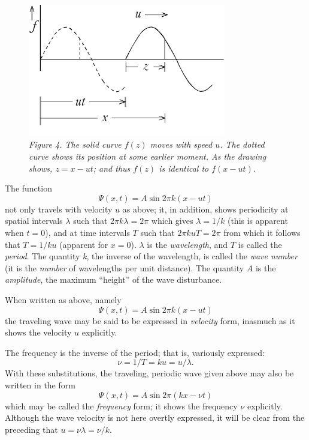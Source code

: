 \begin{figure}[h] %
\centering
    \captionsetup{width=3.4in}
    \includegraphics[width=3.4in,height=2.28in]{images/08_debroglie/image025.png}
    \caption*{\emph{Figure 4. The solid curve $f(z)$ moves with speed $u$.
    The dotted curve shows its position at some earlier moment. As the
    drawing shows, $z = x - ut$; and thus
    $f(z)$ is identical to $f(x-ut)$.}}
\end{figure}

The function
\begin{equation*}
\Psi(x,t) = A \sin 2\pi k(x-ut)
\end{equation*}
not only travels with velocity $u$ as above; it, in addition, shows
periodicity at spatial intervals $\lambda$ such that $2\pi k\lambda = 2\pi$ 
which gives $\lambda = 1/k$ (this is apparent when
$t = 0$), and at time intervals $T$ such that $2\pi kuT = 2\pi$ 
from which it follows that $T = 1/ku$ (apparent
for $x = 0$). $\lambda$ is the \emph{wavelength}, and $T$ is
called the \emph{period}. The quantity \emph{k}, the inverse of
the wavelength, is called the \emph{wave number} (it is the
\emph{number} of wavelengths per unit distance). The quantity $A$
is the \emph{amplitude}, the maximum ``height'' of the wave disturbance.

When written as above, namely
\begin{equation*}
\Psi(x,t) = A \sin 2\pi k(x-ut)
\end{equation*}
the traveling wave may be said to be expressed in \emph{velocity} form,
inasmuch as it shows the velocity $u$ explicitly.

The frequency is the inverse of the period; that is, variously
expressed:
\begin{equation*}
\nu = 1/T = ku = u/\lambda .
\end{equation*}
With these substitutions, the traveling, periodic wave given above may
also be written in the form
\begin{equation*}\tag{1}
\Psi(x,t) = A \sin 2\pi(kx-\nu t)
\end{equation*}
which may be called the \emph{frequency} form; it shows the frequency
$\nu$ explicitly. Although the wave velocity is not here overtly
expressed, it will be clear from the preceding that $u = \nu\lambda = \nu/k$.

